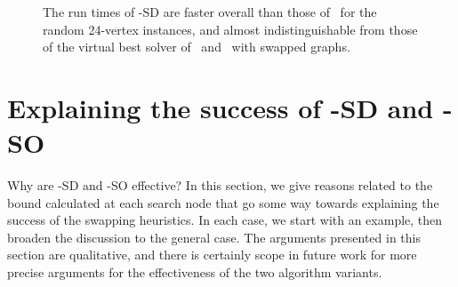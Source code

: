 \begin{figure}[h!]
    \centering
    \caption{The run times of \McSplit-SD are faster overall than those of \McSplit\ for the
        random 24-vertex instances, and almost indistinguishable from those of the virtual
        best solver of \McSplit\ and \McSplit\ with swapped graphs.}
        \label{figure:left-vs-smart-o-mcis}
\end{figure}

\section{Explaining the success of \McSplit-SD and \McSplit-SO}

Why are \McSplit-SD and \McSplit-SO effective?  In this section, we give reasons related
to the bound calculated at each search node that go some way towards explaining
the success of the swapping heuristics.  In each case, we start with an example,
then broaden the discussion to the general case.  The arguments presented in this
section are qualitative, and there is certainly scope in future work for more precise
arguments for the effectiveness of the two algorithm variants.

